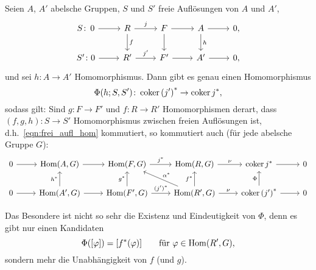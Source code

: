 \begin{prop}
  \label{thm:hom_freier_aufloesungen}
  Seien $A$, $A'$ abelsche Gruppen, $S$ und $S'$ freie Auflösungen von $A$ und $A'$,
  \begin{equation*}
    \begin{tikzcd}
      S\colon\,0 \arrow{r}{} & R   \arrow{d}{f}
                              \arrow{r}{j}  & F   \arrow{d}{}
                                                  \arrow{r}{}   & A   \arrow{d}{h}
                                                                      \arrow{r}{} & 0, \\
      S'\colon 0 \arrow{r}{} & R'  \arrow{r}{j'} & F'  \arrow{r}{}   & A'  \arrow{r}{} & 0,
    \end{tikzcd}
  \end{equation*}
  und sei $h\colon A \to A'$ Homomorphismus.
  Dann gibt es genau einen Homomorphismus
  \begin{equation*}
    \Phi(h;S,S') \colon \operatorname{coker} {(j')}^* \to \operatorname{coker} j^*,
  \end{equation*}
  sodass gilt: Sind $g \colon F \to F'$ und $f \colon R \to R'$ Homomorphismen derart, dass $(f,g,h) \colon S \to S'$ Homomorphismus zwischen freien Auflösungen ist, d.h.~\eqref{eqn:frei_aufl_hom} kommutiert, so kommutiert auch (für jede abelsche Gruppe $G$):
  \begin{equation*}
    \begin{tikzcd}
      0 \arrow{r}{}   & \Hom(A,G)   \arrow{r}{}   & \Hom(F,G) \arrow{r}{j^*}        & \Hom(R,G) \arrow{r}{\nu}  & \coker j^* \arrow{r}{}      & 0 \\
      0 \arrow{r}{}   & \Hom(A',G)  \arrow{u}{h^*}
                                    \arrow{r}{}   & \Hom(F',G)\arrow{u}{g^*}
                                                              \arrow{r}{{(j')}^*}  & \Hom(R',G) \arrow{u}{f^*}
                                                                                                \arrow[swap]{ul}{\alpha^*}
                                                                                                \arrow{r}{\nu} & \coker {(j')}^* \arrow{u}{\Phi}
                                                                                                                              \arrow{r}{} & 0
    \end{tikzcd}
  \end{equation*}
\end{prop}
\begin{kommentar}
  Das Besondere ist nicht so sehr die Existenz und Eindeutigkeit von $\Phi$, denn es gibt nur einen Kandidaten
  \begin{equation*}
    \Phi([\varphi]) = [f^*(\varphi)]  \qquad \text{für } \varphi \in \mathrm{Hom}(R',G),
  \end{equation*}
  sondern mehr die Unabhängigkeit von $f$ (und $g$).
\end{kommentar}
